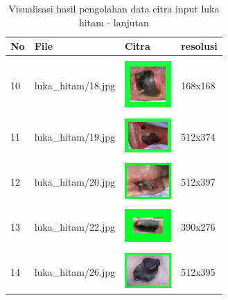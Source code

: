 \begin{table}[H]
	\centering
	\caption{Visualisasi hasil pengolahan data citra input luka hitam - lanjutan}
	\label{tabel_input_2}
	\begin{tabular}{|m{0.2in}|m{1.2in}|m{0.7in}|m{0.7in}|}
		\hline
		\textbf{No} & \textbf{File} & \textbf{Citra} & \textbf{resolusi} \\
		\hline
		
		& &  &  \\
		10 & 
		luka\_hitam/18.jpg &
		\includegraphics[width=0.7in]{gambar/dataset_citra/luka_hitam/bahan/18.jpg}&
		168x168\\
		\hline
		
		& &  &  \\
		11& 
		luka\_hitam/19.jpg &
		\includegraphics[width=0.7in]{gambar/dataset_citra/luka_hitam/bahan/19.jpg}&
		512x374\\
		\hline
		
		& &  &  \\
		12& 
		luka\_hitam/20.jpg &
		\includegraphics[width=0.7in]{gambar/dataset_citra/luka_hitam/bahan/20.jpg}&
		512x397\\
		\hline
		
		& &  &  \\
		13& 
		luka\_hitam/22.jpg &
		\includegraphics[width=0.7in]{gambar/dataset_citra/luka_hitam/bahan/22.jpg}&
		390x276\\
		\hline
		
		& &  &  \\
		14& 
		luka\_hitam/26.jpg &
		\includegraphics[width=0.7in]{gambar/dataset_citra/luka_hitam/bahan/26.jpg}&
		512x395\\
		\hline


\end{tabular}
\end{table}
